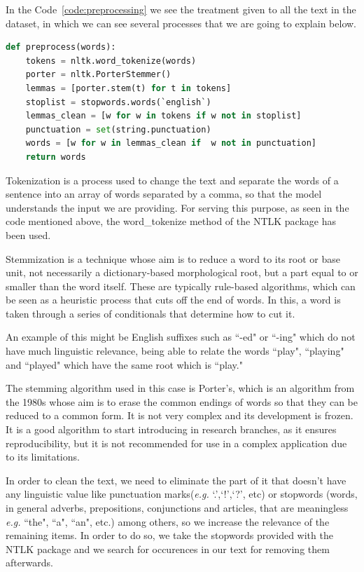 In the Code~\ref{code:preprocessing} we see the treatment given to all the text in the dataset, in which we can see several processes that we are going to explain below.

\begin{lstlisting}[language=Python, caption={Preprocessing function for our data}, label={code:preprocessing}]
def preprocess(words):
    tokens = nltk.word_tokenize(words)
    porter = nltk.PorterStemmer()
    lemmas = [porter.stem(t) for t in tokens]
    stoplist = stopwords.words(`english`)
    lemmas_clean = [w for w in tokens if w not in stoplist]
    punctuation = set(string.punctuation)
    words = [w for w in lemmas_clean if  w not in punctuation]
    return words
\end{lstlisting}

Tokenization is a process used to change the text and separate the words of a sentence into an array of words separated by a comma, so that the model understands the input we are providing. For serving this purpose, as seen in the code mentioned above, the word\_tokenize method of the NTLK package has been used.

Stemmization is a technique whose aim is to reduce a word to its root or base unit, not necessarily a dictionary-based morphological root, but a part equal to or smaller than the word itself. These are typically rule-based algorithms, which can be seen as a heuristic process that cuts off the end of words. In this, a word is taken through a series of conditionals that determine how to cut it.

An example of this might be English suffixes such as ``-ed" or ``-ing" which do not have much linguistic relevance, being able to relate the words ``play", ``playing" and ``played" which have the same root which is ``play."

The stemming algorithm used in this case is Porter's, which is an algorithm from the 1980s whose aim is to erase the common endings of words so that they can be reduced to a common form. It is not very complex and its development is frozen. It is a good algorithm to start introducing in research branches, as it ensures reproducibility, but it is not recommended for use in a complex application due to its limitations.

In order to clean the text, we need to eliminate the part of it that doesn't have any linguistic value like punctuation marks(\textit{e.g.} `.',`!',`?', etc) or stopwords (words, in general adverbs, prepositions, conjunctions and articles, that are meaningless \textit{e.g.} ``the", ``a", ``an", etc.) among others, so we increase the relevance of the remaining items. In order to do so, we take the stopwords provided with the NTLK package and we search for occurences in our text for removing them afterwards.\\


